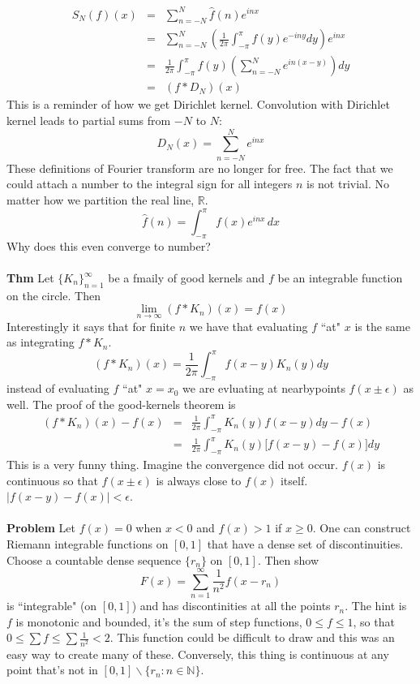 \documentclass[12pt]{article}
\begin{document}
\begin{eqnarray*}
S_N(f)(x) &=& \sum_{n = - N}^N \hat{f}(n) e^{in x}  \\
&=& \sum_{n = -N}^N \left( \frac{1}{2\pi} \int_{-\pi}^\pi f(y) e^{-iny} dy \right) e^{in x} \\
&=& \frac{1}{2\pi} \int_{-\pi}^\pi f(y) \left( \sum_{n = - N}^N e^{in(x-y)}\right) dy \\
&=& (f * D_N)(x)
\end{eqnarray*}
This is a reminder of how we get Dirichlet kernel.  Convolution with Dirichlet kernel leads to partial sums from $-N$ to $N$:
$$ D_N(x) = \sum_{n = -N}^N e^{inx} $$
These definitions of Fourier transform are no longer for free.  The fact that we could attach a number to the integral sign for all integers $n$ is not trivial.  No matter how we partition the real line, $\mathbb{R}$.
$$ \hat{f}(n) = \int_{-\pi}^\pi f(x) e^{inx} \, dx $$
Why does this even converge to number? \\ \\
\textbf{Thm} Let $\{ K_n\}_{n=1}^\infty$ be a fmaily of good kernels and $f$ be an integrable function on the circle.  Then 
$$ \lim_{n \to \infty} (f * K_n)(x) = f(x) $$
Interestingly it says that for finite $n$ we have that evaluating $f$  ``at" $x$ is the same as integrating $f*K_n$.
$$ (f * K_n) (x) = \frac{1}{2\pi} \int_{-\pi}^\pi f(x-y) K_n(y) dy $$
instead of evaluating $f$ ``at" $x = x_0$ we are evluating at nearbypoints $f(x \pm \epsilon)$ as well.  The proof of the good-kernels theorem is
\begin{eqnarray*}
(f * K_n)(x) - f(x) &=& \frac{1}{2\pi} \int_{-\pi}^\pi K_n (y) f(x-y) dy - f(x) \\ 
&=& \frac{1}{2\pi} \int_{-\pi}^\pi K_n(y) \big[ f(x-y) - f(x)\big] dy 
\end{eqnarray*}
This is a very funny thing.  Imagine the convergence did not occur.  $f(x)$ is continuous so that $f(x\pm \epsilon)$ is always close to $f(x)$ itself.  $|f(x-y) - f(x) |< \epsilon$. \\ \\ 
\textbf{Problem} Let $f(x) = 0$ when $x < 0$ and $f(x) > 1$ if $x \geq 0$.  One can construct Riemann integrable functions on $[0,1]$ that have a dense set of discontinuities.  Choose a countable dense sequence $\{ r_n\}$ on $[0,1]$.  Then show 
$$ F(x) = \sum_{n = 1}^\infty \frac{1}{n^2} f(x - r_n) $$
is ``integrable" (on $[0,1]$) and has discontinities at all the points $r_n$.  The hint is $f$ is monotonic and bounded, it's the sum of step functions, $0 \leq f \leq 1$, so that $0 \leq \sum f \leq \sum \frac{1}{n^2} < 2$.  This function could be difficult to draw and this was an easy way to create many of these.  Conversely, this thing is continuous at any point that's not in $[0,1] \backslash \{ r_n : n \in \mathbb{N}\}$.
\end{document}

